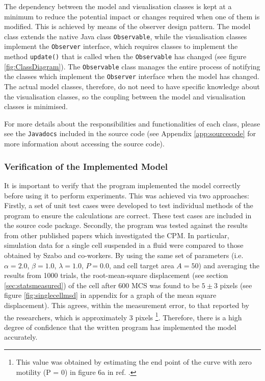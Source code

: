 \documentclass[a4paper,12pt]{article}
\begin{document}
The dependency between the model and visualisation classes is kept at a minimum to reduce the potential impact or changes required when one of them is modified. This is achieved by means of the observer design pattern. The model class extends the native Java class \texttt{Observable}, while the visualisation classes implement the \texttt{Observer} interface, which requires classes to implement the method \texttt{update()} that is called when the \texttt{Observable} has changed (see figure \ref{fig:ClassDiagram}). The \texttt{Observable} class manages the entire process of notifying the classes which implement the \texttt{Observer} interface when the model has changed. The actual model classes, therefore, do not need to have specific knowledge about the visualisation classes, so the coupling between the model and visualisation classes is minimised.

For more details about the responsibilities and functionalities of each class, please see the \texttt{Javadocs} included in the source code (see Appendix \ref{app:sourcecode} for more information about accessing the source code). 


\subsubsection{Verification of the Implemented Model}
It is important to verify that the program implemented the model correctly before using it to perform experiments. This was achieved via two approaches: Firstly, a set of unit test cases were developed to test individual methods of the program to ensure the calculations are correct. These test cases are included in the source code package. Secondly, the program was tested against the results from other published papers which investigated the CPM. In particular, simulation data for a single cell suspended in a fluid were compared to those obtained by Szabo and co-workers\cite{szabo2010}. By using the same set of parameters (i.e. $\alpha = 2.0$, $\beta = 1.0$, $\lambda = 1.0$, $P = 0.0$, and cell target area $A = 50$) and averaging the results from 1000 trials, the root-mean-square displacement (see section \ref{sec:statsmeasured}) of the cell after 600 MCS was found to be $5 \pm 3$ pixels (see figure \ref{fig:singlecellmsd} in appendix for a graph of the mean square displacement). This agrees, within the measurement error, to that reported by the researchers, which is approximately 3 pixels \footnote{This value was obtained by estimating the end point of the curve with zero motility (P = 0) in figure 6a in ref. \cite{szabo2010}.}. Therefore, there is a high degree of confidence that the written program has implemented the model accurately.
\end{document}
